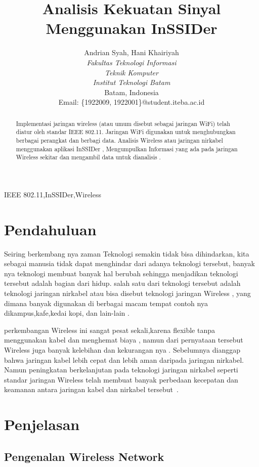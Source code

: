 \documentclass[conference]{IEEEtran}
\title{Analisis Kekuatan Sinyal Menggunakan InSSIDer}
\author{Andrian Syah\IEEEauthorrefmark{1}, Hani Khairiyah\IEEEauthorrefmark{2}\\
\textit{Fakultas Teknologi Informasi}\\
\textit{Teknik Komputer}\\
\textit{Institut Teknologi Batam}\\
Batam, Indonesia\\
Email: \{\IEEEauthorrefmark{1}1922009, \IEEEauthorrefmark{2}1922001\}@student.iteba.ac.id}
\begin{document}
\maketitle

\begin{abstract}
    Implementasi jaringan wireless (atau umum disebut sebagai jaringan WiFi) telah diatur oleh standar
IEEE 802.11. Jaringan WiFi digunakan untuk menghubungkan berbagai perangkat dan berbagi data.
    Analisis Wireless atau jaringan nirkabel menggunakan aplikasi InSSIDer ,
    Mengumpulkan Informasi yang ada pada jaringan Wireless sekitar dan mengambil data 
    untuk dianalisis .
\end{abstract}

\begin{IEEEkeywords}
    IEEE 802.11,InSSIDer,Wireless
\end{IEEEkeywords}

\section{Pendahuluan}
Seiring berkembang nya zaman Teknologi semakin tidak bisa dihindarkan, 
kita sebagai manusia tidak dapat menghindar dari adanya teknologi tersebut,
banyak nya teknologi membuat banyak hal berubah sehingga menjadikan teknologi tersebut 
adalah bagian dari hidup. salah satu dari teknologi tersebut adalah teknologi jaringan nirkabel
atau bisa disebut teknologi jaringan Wireless , yang dimana banyak digunakan di berbagai macam tempat 
contoh nya dikampus,kafe,kedai kopi, dan lain-lain .

perkembangan Wireless ini sangat pesat sekali,karena flexible tanpa menggunakan kabel dan menghemat biaya 
, namun dari pernyataan tersebut Wireless juga banyak kelebihan dan kekurangan nya . 
Sebelumnya dianggap bahwa jaringan kabel lebih cepat dan lebih aman daripada jaringan nirkabel.
Namun peningkatan berkelanjutan pada teknologi jaringan nirkabel seperti standar jaringan Wireless
 telah membuat banyak perbedaan kecepatan dan keamanan antara jaringan kabel dan nirkabel tersebut~.

\section{Penjelasan}
\subsection{Pengenalan Wireless Network}
\end{document}
